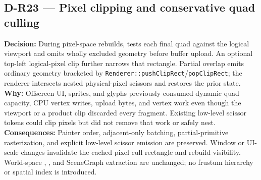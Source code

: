 \subsection*{D-R23 --- Pixel clipping and conservative quad culling}
\begin{decisionbox}[title={D-R23 \quad 2026-09-15}]
\textbf{Decision:} During pixel-space rebuilds,  tests
each final quad against the logical viewport and omits wholly excluded geometry
before buffer upload. An optional top-left logical-pixel clip further narrows
that rectangle. Partial overlap emits ordinary geometry bracketed by
\texttt{Renderer::pushClipRect}/\texttt{popClipRect}; the renderer intersects
nested physical-pixel scissors and restores the prior state.\\
\textbf{Why:} Offscreen UI, sprites, and glyphs previously consumed dynamic
quad capacity, CPU vertex writes, upload bytes, and vertex work even though the
viewport or a product clip discarded every fragment. Existing low-level
scissor tokens could clip pixels but did not remove that work or safely nest.\\
\textbf{Consequences:} Painter order, adjacent-only batching, partial-primitive
rasterization, and explicit low-level scissor emission are preserved. Window
or UI-scale changes invalidate the cached pixel cull rectangle and rebuild
visibility. World-space , , and
SceneGraph extraction are unchanged; no frustum hierarchy or spatial index is
introduced.
\end{decisionbox}

